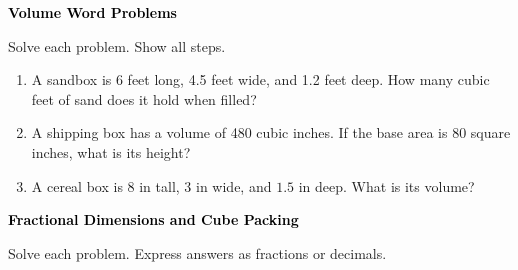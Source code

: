 \documentclass[12pt, letterpaper, fleqn]{article}
\begin{document}
\newpage

\begin{tcolorbox}[colback=black!10]
\large\textcolor{black}{\textbf{Volume Word Problems}}
\end{tcolorbox}

\noindent
Solve each problem. Show all steps.

\vspace{3mm}

\begin{enumerate}[itemsep=2.2cm, leftmargin=0.6cm]

\item A sandbox is 6 feet long, 4.5 feet wide, and 1.2 feet deep. How many cubic feet of sand does it hold when filled?

\vspace{3cm}

\item A shipping box has a volume of 480 cubic inches. If the base area is 80 square inches, what is its height?

\vspace{3cm}

\item A cereal box is $8\text{ in}$ tall, $3\text{ in}$ wide, and $1.5\text{ in}$ deep. What is its volume?

\vspace{2cm}

\end{enumerate}

\newpage

\begin{tcolorbox}[colback=black!10]
\large\textcolor{black}{\textbf{Fractional Dimensions and Cube Packing}}
\end{tcolorbox}

\noindent
Solve each problem. Express answers as fractions or decimals.

\vspace{3mm}
\end{document}
